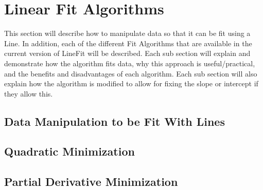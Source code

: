 \documentclass[titlepage,12pt]{article}
\begin{document}
\section{Linear Fit Algorithms}
\label{sec:algorithms}

This section will describe how to manipulate data so that it can be fit using a Line. In addition, each of the different Fit Algorithms that are available in the current version of LineFit will be described. Each sub section will explain and demonstrate how the algorithm fits data, why this approach is useful/practical, and the benefits and disadvantages of each algorithm. Each sub section will also explain how the algorithm is modified to allow for fixing the slope or intercept if they allow this.



\subsection{Data Manipulation to be Fit With Lines}
\label{sec:dataManipulation}

\subsection{Quadratic Minimization}

\subsection{Partial Derivative Minimization}
\end{document}
